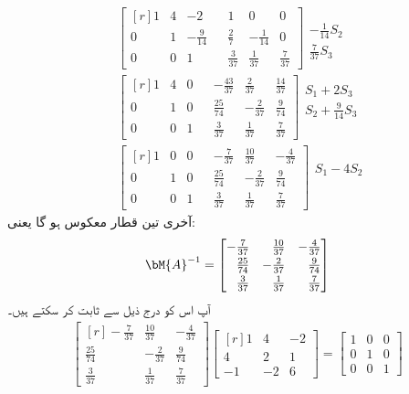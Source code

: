  \begin{align*}
&\begin{bmatrix*}[r] 1&4&-2&& 1&0&0\\[0.5ex]0&1&-\frac{9}{14}&&\frac{2}{7}&-\frac{1}{14}&0\\[0.5ex]0&0&1&&\frac{3}{37}&\frac{1}{37}&\frac{7}{37}\end{bmatrix*}
\begin{matrix} \\[0.5ex]-\frac{1}{14}S_2 \\[0.5ex] \frac{7}{37}S_3 \end{matrix}\\
&\begin{bmatrix*}[r] 1&4&0&&-\frac{43}{37}&\frac{2}{37}&\frac{14}{37}\\[0.5ex]0&1&0&&\frac{25}{74}&-\frac{2}{37}&\frac{9}{74}\\[0.5ex]0&0&1&&\frac{3}{37}&\frac{1}{37}&\frac{7}{37}\end{bmatrix*}
\begin{matrix}S_1+2S_3 \\[0.5ex] S_2+\frac{9}{14}S_3  \\[0.5ex] \\  \end{matrix}\\
&\begin{bmatrix*}[r] 1&0&0&&-\frac{7}{37}&\frac{10}{37}&-\frac{4}{37}\\[0.5ex]0&1&0&&\frac{25}{74}&-\frac{2}{37}&\frac{9}{74}\\[0.5ex]0&0&1&&\frac{3}{37}&\frac{1}{37}&\frac{7}{37}\end{bmatrix*}
\begin{matrix}S_1-4S_2 \\ \\ \\  \end{matrix}
\end{align*}
آخری تین قطار معکوس  ہو  گا یعنی:
\begin{align*}
\bM{A}^{-1}=\begin{bmatrix*}[r] -\frac{7}{37}&\frac{10}{37}&-\frac{4}{37}\\[0.5ex]\frac{25}{74}&-\frac{2}{37}&\frac{9}{74}\\[0.5ex]\frac{3}{37}&\frac{1}{37}&\frac{7}{37}\end{bmatrix*}
\end{align*}
آپ اس کو درج ذیل سے ثابت کر سکتے ہیں۔
\begin{align*}
\begin{bmatrix*}[r] -\frac{7}{37}&\frac{10}{37}&-\frac{4}{37}\\[0.5ex]\frac{25}{74}&-\frac{2}{37}&\frac{9}{74}\\[0.5ex]\frac{3}{37}&\frac{1}{37}&\frac{7}{37}\end{bmatrix*}\begin{bmatrix*}[r] 1&4&-2\\4&2&1\\-1&-2&6 \end{bmatrix*}=\begin{bmatrix}1&0&0\\0&1&0\\0&0&1\end{bmatrix}
\end{align*}
